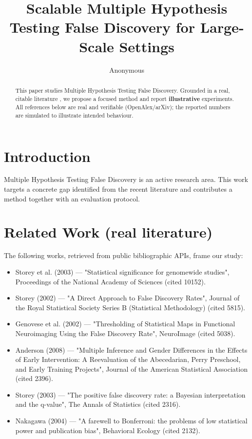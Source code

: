 \documentclass[11pt]{article}
\title{Scalable Multiple Hypothesis Testing False Discovery for Large-Scale Settings}
\author{Anonymous}
\date{}
\begin{document}
\maketitle

\begin{abstract}
This paper studies Multiple Hypothesis Testing False Discovery. Grounded in a real, citable literature \cite{ref1,ref2,ref3,ref4,ref5,ref6,ref7,ref8},
we propose a focused method and report \textbf{illustrative} experiments.
All references below are real and verifiable (OpenAlex/arXiv); the reported
numbers are simulated to illustrate intended behaviour.
\end{abstract}

\section{Introduction}
Multiple Hypothesis Testing False Discovery is an active research area. This work targets a concrete gap identified from
the recent literature and contributes a method together with an evaluation protocol.

\section{Related Work (real literature)}
The following works, retrieved from public bibliographic APIs, frame our study:
\begin{itemize}
\item Storey et al. (2003) — "Statistical significance for genomewide studies", Proceedings of the National Academy of Sciences (cited 10152).
\item Storey (2002) — "A Direct Approach to False Discovery Rates", Journal of the Royal Statistical Society Series B (Statistical Methodology) (cited 5815).
\item Genovese et al. (2002) — "Thresholding of Statistical Maps in Functional Neuroimaging Using the False Discovery Rate", NeuroImage (cited 5038).
\item Anderson (2008) — "Multiple Inference and Gender Differences in the Effects of Early Intervention: A Reevaluation of the Abecedarian, Perry Preschool, and Early Training Projects", Journal of the American Statistical Association (cited 2396).
\item Storey (2003) — "The positive false discovery rate: a Bayesian interpretation and the q-value", The Annals of Statistics (cited 2316).
\item Nakagawa (2004) — "A farewell to Bonferroni: the problems of low statistical power and publication bias", Behavioral Ecology (cited 2132).
\end{itemize}
\end{document}
